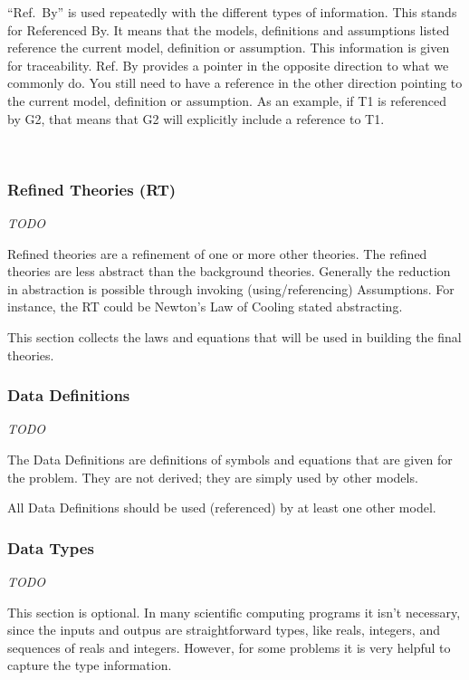 \documentclass[12pt]{article}
\begin{document}
``Ref.\ By'' is used repeatedly with the different types of information. This
stands for Referenced By.  It means that the models, definitions and assumptions
listed reference the current model, definition or assumption. This information
is given for traceability.  Ref. By provides a pointer in the opposite direction
to what we commonly do.  You still need to have a reference in the other
direction pointing to the current model, definition or assumption.  As an
example, if T1 is referenced by G2, that means that G2 will explicitly include a
reference to T1.

~\newline

\subsubsection{Refined Theories (RT)}\label{sec_gendef}

\emph{TODO}

Refined theories are a refinement of one or more other theories. The refined theories are less abstract than the background theories.  Generally the reduction in
abstraction is possible through invoking (using/referencing) Assumptions. For
instance, the RT could be Newton's Law of Cooling stated abstracting.

This section collects the laws and equations that will be used in building the
final theories.

\subsubsection{Data Definitions}\label{sec_datadef}

\emph{TODO}

The Data Definitions are definitions of symbols and equations that are given for
the problem.  They are not derived; they are simply used by other models.

All Data Definitions should be used (referenced) by at least one other model.


\subsubsection{Data Types}\label{sec_datatypes}

\emph{TODO}

This section is optional.  In many scientific computing programs it isn't
necessary, since the inputs and outpus are straightforward types, like reals,
integers, and sequences of reals and integers.  However, for some problems it is
very helpful to capture the type information.
\end{document}

